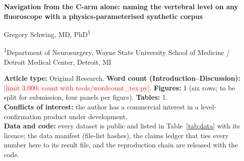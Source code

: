 \documentclass[11pt,letterpaper]{article}
\newcommand{\todo}[1]{\textcolor{red}{[#1]}}
\begin{document}
\begin{titlepage}
\begin{center}
{\Large\bfseries Navigation from the C-arm alone: naming the vertebral level on any fluoroscope with a physics-parameterised synthetic corpus\par}
\vspace{1em}
{\normalsize Gregory Schwing, MD, PhD\textsuperscript{1}\par}
{\small \textsuperscript{1}Department of Neurosurgery, Wayne State University School of Medicine / Detroit Medical Center, Detroit, MI\par}
\end{center}
\vspace{1em}
\noindent\textbf{Article type:} Original Research. \textbf{Word count (Introduction--Discussion):} \todo{limit 3,000; count with tools/wordcount\_tex.py}. \textbf{Figures:} 1 (six rows; to be split for submission, four panels per figure). \textbf{Tables:} 1.\\
\textbf{Conflicts of interest:} the author has a commercial interest in a level-confirmation product under development.\\
\textbf{Data and code:} every dataset is public and listed in Table~\ref{tab:data} with its licence; the data manifest (file-list hashes), the claims ledger that ties every number here to its result file, and the reproduction chain are released with the code.
\end{titlepage}
\end{document}
